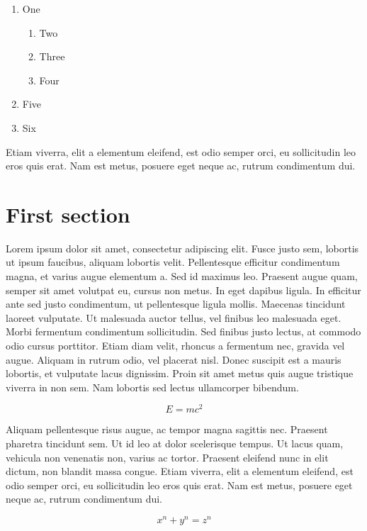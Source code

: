 \documentclass[10pt,a4paper,twoside,twocolumn]{article}
\begin{document}
\begin{enumerate}
	\item One
    \begin{enumerate}
    	\item Two
      \item Three
      \item Four
  \end{enumerate}
  \item Five
  \item Six
\end{enumerate}

Etiam viverra, elit a elementum eleifend, est odio semper orci, eu sollicitudin leo eros quis erat. Nam est metus, posuere eget neque ac, rutrum condimentum dui.

\section{First section}

Lorem ipsum dolor sit amet, consectetur adipiscing elit. Fusce justo sem, lobortis ut ipsum faucibus, aliquam lobortis velit. Pellentesque efficitur condimentum magna, et varius augue elementum a. Sed id maximus leo. Praesent augue quam, semper sit amet volutpat eu, cursus non metus. In eget dapibus ligula. In efficitur ante sed justo condimentum, ut pellentesque ligula mollis. Maecenas tincidunt laoreet vulputate. Ut malesuada auctor tellus, vel finibus leo malesuada eget. Morbi fermentum condimentum sollicitudin. Sed finibus justo lectus, at commodo odio cursus porttitor. Etiam diam velit, rhoncus a fermentum nec, gravida vel augue. Aliquam in rutrum odio, vel placerat nisl. Donec suscipit est a mauris lobortis, et vulputate lacus dignissim. Proin sit amet metus quis augue tristique viverra in non sem. Nam lobortis sed lectus ullamcorper bibendum.

\begin{equation}
E=mc^2
\end{equation}

Aliquam pellentesque risus augue, ac tempor magna sagittis nec. Praesent pharetra tincidunt sem. Ut id leo at dolor scelerisque tempus. Ut lacus quam, vehicula non venenatis non, varius ac tortor. Praesent eleifend nunc in elit dictum, non blandit massa congue. Etiam viverra, elit a elementum eleifend, est odio semper orci, eu sollicitudin leo eros quis erat. Nam est metus, posuere eget neque ac, rutrum condimentum dui.

\[ x^n + y^n = z^n \]
\end{document}
